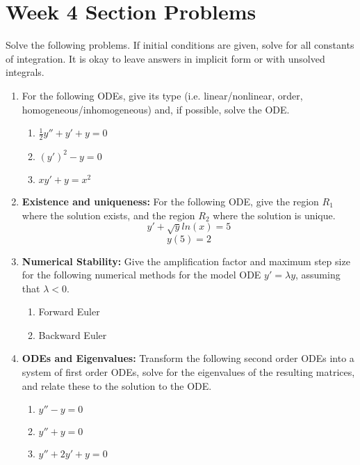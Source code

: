 \documentclass[letterpaper, fontsize=11pt]{scrartcl} %
\numberwithin{equation}{section} %
\numberwithin{figure}{section} %
\numberwithin{table}{section} %
\begin{document}

\newcommand{\horrule}[1]{\rule{\linewidth}{#1}} %


\section*{Week 4 Section Problems}
\par Solve the following problems. If initial conditions are given, solve for all constants of integration. It is okay to leave answers in implicit form or with unsolved integrals. 

\begin{enumerate}

\item For the following ODEs, give its type (i.e. linear/nonlinear, order, homogeneous/inhomogeneous) and, if possible, solve the ODE.
\begin{enumerate}
\item $\frac{1}{2}y'' + y' + y = 0$ \par

\item $(y')^2 - y = 0$ \newline

\item $xy' + y = x^2$ \par

\end{enumerate}

\item \textbf{Existence and uniqueness:} For the following ODE, give the region $R_1$ where the solution exists, and the region $R_2$ where the solution is unique. 
$$ y' + \sqrt{y} ln(x) = 5$$
$$y(5) = 2$$


\item \textbf{Numerical Stability:} Give the amplification factor and maximum step size for the following numerical methods for the model ODE $y' = \lambda y$, assuming that $\lambda < 0$.
\begin{enumerate}
\item Forward Euler \par

\item Backward Euler\par

\end{enumerate}
\item \textbf{ODEs and Eigenvalues:} Transform the following second order ODEs into a system of first order ODEs, solve for the eigenvalues of the resulting matrices, and relate these to the solution to the ODE. 
\begin{enumerate}
\item $y'' - y = 0$ 
\item $y'' + y = 0$
\item $y'' + 2y' + y = 0$
\end{enumerate}


\end{enumerate}

\end{document}
